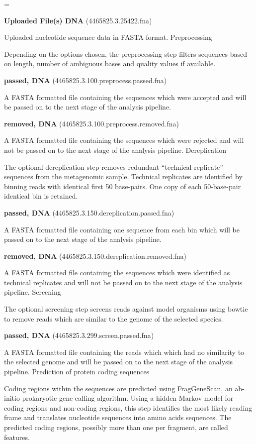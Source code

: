 \documentclass[12pt,fullpage]{report}
\makeatletter
\let\realnormalsize=\normalsize
\def\liih@math{\ifmmode$\else\bad@math\fi}
\def\adjustnormalsize{\def\normalsize{\mathsurround=0pt \realnormalsize
 \parindent=0pt\abovedisplayskip=0pt\belowdisplayskip=0pt}%
 \def\phantompar{\csname par\endcsname}\normalsize}%
\newcommand\lthtmlvboxmathA{\adjustnormalsize\setbox\sizebox=\vbox\bgroup %
 \let\ifinner=\iffalse \let\)\liih@math }%
\newcommand\lthtmlmathtype[1]{\gdef\lthtmlmathenv{#1}}%
\newcommand\lthtmlfigureA[1]{\let\@savefreelist\@freelist
       \lthtmlmathtype{#1}\lthtmlvboxmathA}%
\makeatother
\begin{document}
{\newpage\clearpage
\lthtmlfigureA{mdframed830}%
\begin{mdframed}
\textbf{Uploaded File(s) DNA} (4465825.3.25422.fna)
\par
Uploaded nucleotide sequence data in FASTA format.
Preprocessing
\par
Depending on the options chosen, the preprocessing step filters sequences based on length, number of ambiguous bases and quality values if available.
\par
\textbf{passed, DNA} (4465825.3.100.preprocess.passed.fna)
\par
A FASTA formatted file containing the sequences which were accepted and will be passed on to the next stage of the analysis pipeline.
\par
\textbf{removed, DNA} (4465825.3.100.preprocess.removed.fna)
\par
A FASTA formatted file containing the sequences which were rejected and will not be passed on to the next stage of the analysis pipeline.
Dereplication
\par
The optional dereplication step removes redundant “technical replicate” sequences from the metagenomic sample. Technical replicates are identified by binning reads with identical first 50 base-pairs. One copy of each 50-base-pair identical bin is retained.
\par
\textbf{passed, DNA} (4465825.3.150.dereplication.passed.fna)
\par
A FASTA formatted file containing one sequence from each bin which will be passed on to the next stage of the analysis pipeline.
\par
\textbf{removed, DNA} (4465825.3.150.dereplication.removed.fna)
\par
A FASTA formatted file containing the sequences which were identified as technical replicates and will not be passed on to the next stage of the analysis pipeline.
Screening
\par
The optional screening step screens reads against model organisms using bowtie to remove reads which are similar to the genome of the selected species.
\par
\textbf{passed, DNA} (4465825.3.299.screen.passed.fna)
\par
A FASTA formatted file containing the reads which which had no similarity to the selected genome and will be passed on to the next stage of the analysis pipeline.
Prediction of protein coding sequences
\par
Coding regions within the sequences are predicted using FragGeneScan, an ab-initio prokaryotic gene calling algorithm. Using a hidden Markov model for coding regions and non-coding regions, this step identifies the most likely reading frame and translates nucleotide sequences into amino acids sequences. The predicted coding regions, possibly more than one per fragment, are called features.

\end{mdframed}}
\end{document}

